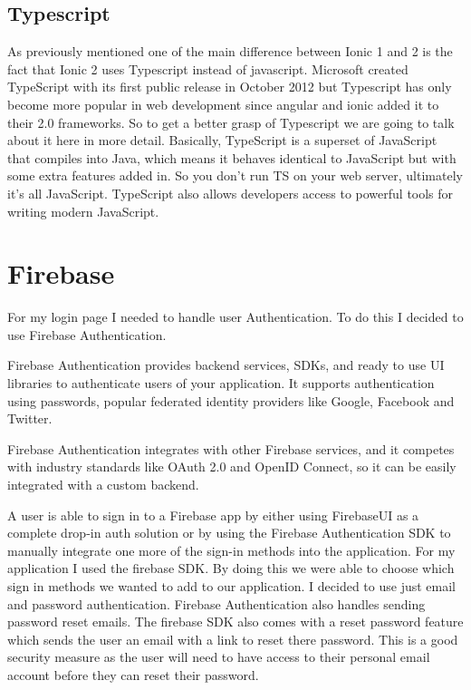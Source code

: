 \subsection {Typescript}
As previously mentioned one of the main difference between Ionic 1 and 2 is the fact that Ionic 2 uses Typescript instead of javascript. Microsoft created TypeScript with its first public release in October 2012 but Typescript has only become more popular in web development since angular and ionic added it to their 2.0 frameworks. So to get a better grasp of Typescript we are going to talk about it here in more detail.
Basically, TypeScript is a superset of JavaScript that compiles into Java, which means it behaves identical to JavaScript but with some extra features added in. So you don't run TS on your web server, ultimately it’s all JavaScript. TypeScript also allows developers access to powerful tools for writing modern JavaScript.\cite{typescript} \cite{typescript2}



\section{Firebase}

For my login page I needed to handle user Authentication. To do this I decided to use Firebase Authentication. 

Firebase Authentication provides backend services, SDKs, and ready to use UI libraries to authenticate users of your application. It supports authentication using passwords, popular federated identity providers like Google, Facebook and Twitter.\cite{firebaseauth}

Firebase Authentication integrates with other Firebase services, and it competes with industry standards like OAuth 2.0 and OpenID Connect, so it can be easily integrated with a custom backend. 

A user is able to sign in to a Firebase app by either using FirebaseUI as a complete drop-in auth solution or by using the Firebase Authentication SDK to manually integrate one more of the  sign-in methods into the application. For my application I used the firebase SDK. By doing this we were able to choose which sign in methods we wanted to add to our application. I decided to use just email and password authentication. 
Firebase Authentication also handles sending password reset emails. The firebase SDK also comes with a reset password feature which sends the user an email with a link to reset there password. This is a good security measure as the user will need to have access to their personal email account before they can reset their password.\cite{firebase}



